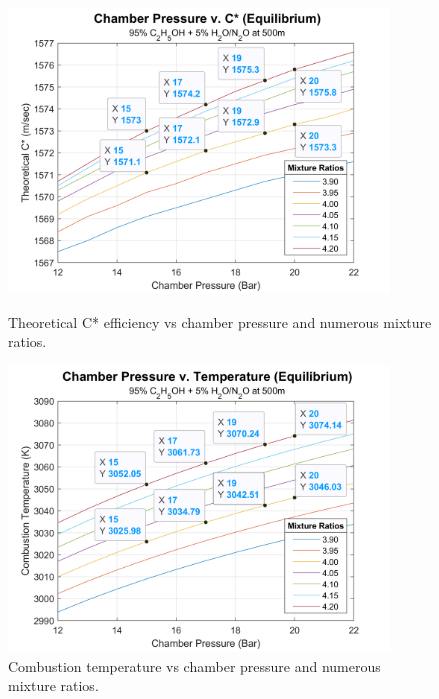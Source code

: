 \documentclass[9pt]{article} %
\numberwithin{equation}{section} %
\begin{document}
\begin{figure}[H]
    \centering
    \begin{minipage}{0.475\textwidth}
        \centering
        \includegraphics[scale=0.5, width=0.9\textwidth]{cp_cstar_mix_labeled} %
        \caption{Theoretical C* efficiency vs chamber pressure and numerous mixture ratios.}
        \label{fig:cp_cstar}
    \end{minipage}\hfill
    \begin{minipage}{0.475\textwidth}
        \centering
        \includegraphics[scale=0.5, width=0.9\textwidth]{cp_temp_mix_labeled} %
        \caption{Combustion temperature vs chamber pressure and numerous mixture ratios.}
        \label{fig:cp_temp}
    \end{minipage}
\end{figure} 
\end{document}
